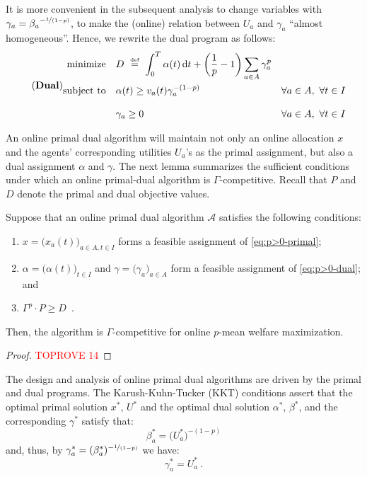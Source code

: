\documentclass[11pt,letterpaper]{article}
\newcommand{\A}{\mathcal{A}}
\newcommand{\dif}[1]{\,\text{\rm d} #1}
\newcommand{\utility}{U}
\newcommand{\defeq}{\stackrel{\textrm{\tiny def}}{=}}
\begin{document}
It is more convenient in the subsequent analysis to change variables with $\gamma_a = {\beta_a}^{- \nicefrac{1}{(1-p)}}$, to make the (online) relation between $\utility_a$ and $\gamma_a$ ``almost homogeneous''.
Hence, we rewrite the dual program as follows:
\begin{equation}
\tag{\text{\rm\bf Dual}}
\label{eq:p>0-dual}
\begin{aligned}
	\text{minimize} \quad & 
	D ~\defeq~ \int_0^T \alpha(t) \dif{t} + \left( \frac{1}{p} - 1 \right) \sum_{a\in A} \gamma_a^{p}  \\
	\text{subject to} \quad & \alpha(t) \geq v_{a}(t) \gamma_a^{-(1-p)} && \forall a \in A, ~\forall t \in I \\[2ex]
	& \gamma_a \geq 0 && \forall a \in A, ~\forall t \in I
\end{aligned}
\end{equation}

An online primal dual algorithm will maintain not only an online allocation $x$ and the agents' corresponding utilities $\utility_a$'s as the primal assignment, but also a dual assignment $\alpha$ and $\gamma$.
The next lemma summarizes the sufficient conditions under which an online primal-dual algorithm is $\Gamma$-competitive.
Recall that $P$ and $D$ denote the primal and dual objective values.

\begin{lemma}
	\label{lem:p>0-primal-dual}
	Suppose that an online primal dual algorithm $\A$ satisfies the following conditions:
	\begin{enumerate}[label=(\alph*)]
		\item $x = \big( x_a(t) \big)_{a \in A, t \in I}$ forms a feasible assignment of \ref{eq:p>0-primal}; \label{cond:p>0-primal-feasibility}
		\item $\alpha = \big( \alpha(t) \big)_{t \in I}$ and $\gamma = \big( \gamma_a \big)_{a \in A}$ form a feasible assignment of \ref{eq:p>0-dual}; and \label{cond:p>0-dual-feasibility}
		\item $\Gamma^p \cdot P \geq D$~. \label{cond:p>0-ratio}
	\end{enumerate}
	Then, the algorithm is $\Gamma$-competitive for online $p$-mean welfare maximization.
\end{lemma}

\begin{proof}\textcolor{red}{TOPROVE 14}\end{proof}
	
The design and analysis of online primal dual algorithms are driven by the primal and dual programs.
The Karush-Kuhn-Tucker (KKT) conditions assert that the optimal primal solution $x^*$, $\utility^*$ and the optimal dual solution $\alpha^*$, $\beta^*$, and the corresponding $\gamma^*$ satisfy that:
\[
	\beta_a^* = \big( \utility_a^* \big)^{-(1-p)}
\]
and, thus, by $\gamma_a^* = (\beta_a^*)^{-\nicefrac{1}{(1-p)}}$ we have:
\[
	\gamma_a^* = \utility_a^*
	~.
\]
\end{document}
